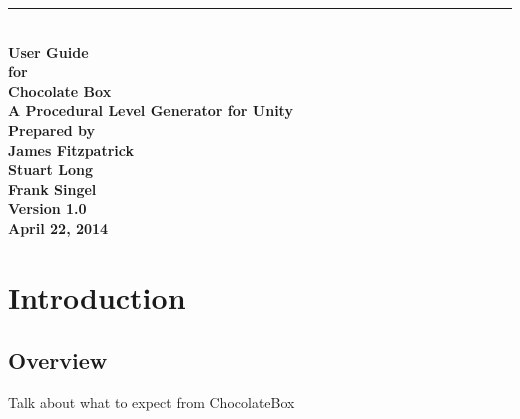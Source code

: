\documentclass[pdftex,12pt,letter]{article}
\newcommand{\HRule}{\rule{\linewidth}{0.5mm}}
\begin{document}
\begin{titlepage}
\begin{flushright}
\HRule \\[0.4cm]
{ \bfseries
{\huge User Guide\\[1cm]}
{\Large for\\[1cm]}
{\huge Chocolate Box\large\\[.1cm]
A Procedural Level Generator for Unity\\[3cm]}
{\large Prepared by\\[1cm]James Fitzpatrick\\Stuart Long\\Frank Singel\\[2cm]
Version 1.0\\
April 22, 2014\\
}}
\end{flushright}
\end{titlepage}
\FloatBarrier
\newpage
\tableofcontents
\newpage

\section{Introduction}
\subsection{Overview}
Talk about what to expect from ChocolateBox
\end{document}
